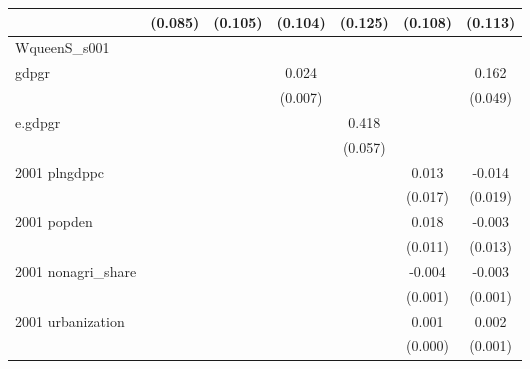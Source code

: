 \begin{table}[htbp]
\begin{tabular}{l*{6}{c}}
                    &     (0.085)         &     (0.105)         &     (0.104)         &     (0.125)         &     (0.108)         &     (0.113)         \\
\hline
WqueenS\_s001        &                     &                     &                     &                     &                     &                     \\
gdpgr               &                     &                     &       0.024\sym{***}&                     &                     &       0.162\sym{***}\\
                    &                     &                     &     (0.007)         &                     &                     &     (0.049)         \\
e.gdpgr             &                     &                     &                     &       0.418\sym{***}&                     &                     \\
                    &                     &                     &                     &     (0.057)         &                     &                     \\
2001 plngdppc       &                     &                     &                     &                     &       0.013         &      -0.014         \\
                    &                     &                     &                     &                     &     (0.017)         &     (0.019)         \\
2001 popden         &                     &                     &                     &                     &       0.018         &      -0.003         \\
                    &                     &                     &                     &                     &     (0.011)         &     (0.013)         \\
2001 nonagri\_share  &                     &                     &                     &                     &      -0.004\sym{***}&      -0.003\sym{***}\\
                    &                     &                     &                     &                     &     (0.001)         &     (0.001)         \\
2001 urbanization   &                     &                     &                     &                     &       0.001\sym{***}&       0.002\sym{***}\\
                    &                     &                     &                     &                     &     (0.000)         &     (0.001)         \\

\end{tabular}
\end{table}
